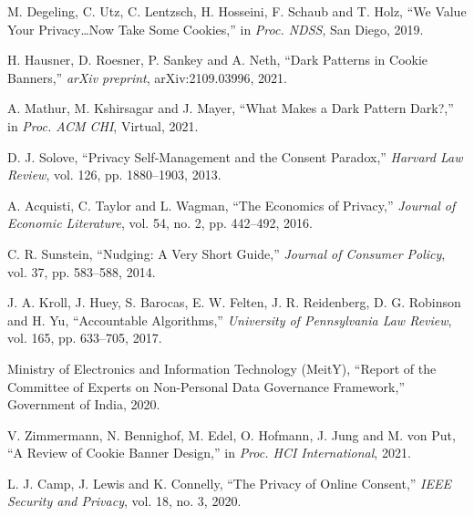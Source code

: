 \documentclass[12pt,a4paper]{report}
\begin{document}
\begin{enumerate}[leftmargin=1.5cm, label={[\arabic*]}]
\item M. Degeling, C. Utz, C. Lentzsch, H. Hosseini, F. Schaub and T. Holz,
``We Value Your Privacy\ldots Now Take Some Cookies,''
in \textit{Proc. NDSS}, San Diego, 2019.

\item H. Hausner, D. Roesner, P. Sankey and A. Neth,
``Dark Patterns in Cookie Banners,''
\textit{arXiv preprint}, arXiv:2109.03996, 2021.

\item A. Mathur, M. Kshirsagar and J. Mayer,
``What Makes a Dark Pattern Dark?,''
in \textit{Proc. ACM CHI}, Virtual, 2021.

\item D. J. Solove,
``Privacy Self-Management and the Consent Paradox,''
\textit{Harvard Law Review}, vol. 126, pp. 1880--1903, 2013.

\item A. Acquisti, C. Taylor and L. Wagman,
``The Economics of Privacy,''
\textit{Journal of Economic Literature}, vol. 54, no. 2, pp. 442--492, 2016.

\item C. R. Sunstein,
``Nudging: A Very Short Guide,''
\textit{Journal of Consumer Policy}, vol. 37, pp. 583--588, 2014.

\item J. A. Kroll, J. Huey, S. Barocas, E. W. Felten, J. R. Reidenberg,
D. G. Robinson and H. Yu,
``Accountable Algorithms,''
\textit{University of Pennsylvania Law Review}, vol. 165, pp. 633--705, 2017.

\item Ministry of Electronics and Information Technology (MeitY),
``Report of the Committee of Experts on Non-Personal Data Governance
Framework,'' Government of India, 2020.

\item V. Zimmermann, N. Bennighof, M. Edel, O. Hofmann, J. Jung and
M. von Put,
``A Review of Cookie Banner Design,''
in \textit{Proc. HCI International}, 2021.

\item L. J. Camp, J. Lewis and K. Connelly,
``The Privacy of Online Consent,''
\textit{IEEE Security and Privacy}, vol. 18, no. 3, 2020.

\end{enumerate}
\end{document}
